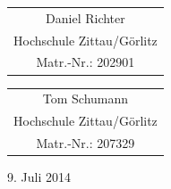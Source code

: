 \begin{titlepage}
\begin{center}
\vspace*{.5cm}
\begin{tabular}[m]{c}
Daniel Richter \\Hochschule Zittau/Görlitz\\ Matr.-Nr.: 202901
\end{tabular}
\hspace{4cm}
\vspace*{.5cm}
\begin{tabular}[m]{c}
Tom Schumann \\Hochschule Zittau/Görlitz\\ Matr.-Nr.: 207329
\end{tabular}

\vspace{3cm}

9. Juli 2014

\end{center}
\end{titlepage}